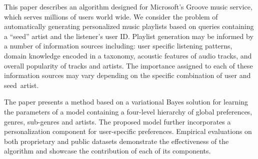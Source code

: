 This paper describes an algorithm designed for Microsoft's Groove music service, which serves millions of users world wide.  We consider the problem of automatically generating personalized music playlists based on queries containing a ``seed'' artist and the listener's user ID. 
Playlist generation may be informed by a number of information sources including: user specific listening patterns, domain knowledge encoded in a taxonomy, acoustic features of audio tracks, and overall popularity of tracks and artists. The importance assigned to each of these information sources may vary depending on the specific combination of user and seed~artist.

The paper presents a method based on a variational Bayes solution for learning the parameters of a model containing a four-level hierarchy of global preferences, genres, sub-genres and artists. The proposed model further incorporates a personalization component for user-specific preferences.
Empirical evaluations on both proprietary and public datasets demonstrate the effectiveness of the algorithm and showcase the contribution of each of its components.


 
